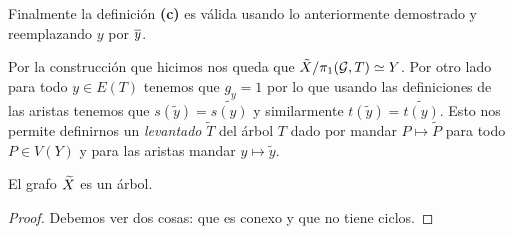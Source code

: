 \documentclass[tesis.tex]{subfiles}
\begin{document}
Finalmente la definición \textbf{(c)} es válida usando lo anteriormente demostrado y reemplazando $y$ por $\overline y$.

\medskip

Por la construcción que hicimos nos queda que $\tilde X / \pi_1({\cal G}, T) \simeq Y$.
Por otro lado para todo $y \in E(T)$ tenemos que $g_y=1$ por lo que usando las definiciones de las aristas tenemos que $s(\tilde y) = \widetilde{s(y)}$ y similarmente $t(\tilde y) = \widetilde{t(y)}$.
Esto nos permite definirnos un \emph{levantado} $\widetilde{T}$ del árbol $T$ dado por mandar $P \mapsto \tilde P$ para todo $P \in V(Y)$ y para las aristas mandar $y \mapsto \tilde y$. 

\begin{teo}[Serre]
	El grafo $\widetilde X$ es un árbol.
\end{teo}
\begin{proof}
	Debemos ver dos cosas: que es conexo y que no tiene ciclos.
	

\end{proof}
\end{document}
